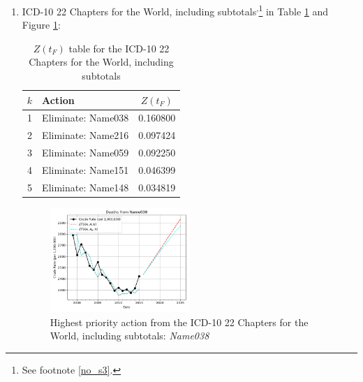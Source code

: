 \documentclass[12pt, a4paper, twocolumn]{article}
\begin{document}
\begin{enumerate}
  \vfill\eject
  \item ICD-10 22 Chapters for the World, including subtotals\cite{whomortality}\textsuperscript{,}\footnote{See footnote \ref{no_s3}.} in Table \ref{table:ztable9} and Figure \ref{fig:k9}:
    \begin{table}[H]
      \centering
      \begin{tabular}{clc}
        \toprule
          $k$ & Action             & $Z(t_F)$ \\
        \midrule
          1   & Eliminate: Name038 & 0.160800 \\
          2   & Eliminate: Name216 & 0.097424 \\
          3   & Eliminate: Name059 & 0.092250 \\
          4   & Eliminate: Name151 & 0.046399 \\
          5   & Eliminate: Name148 & 0.034819 \\
        \bottomrule
      \end{tabular}
      \caption{$Z(t_F)$ table for the ICD-10 22 Chapters for the World, including subtotals}
      \label{table:ztable9}
    \end{table}
    \begin{figure}[H]
      \centering
      \includegraphics[width=0.5\textwidth]{results/WORLD_ICD10_CHAPTERS_ALL/Name038_ets.png}
      \caption{Highest priority action from the ICD-10 22 Chapters for the World, including subtotals: \textit{Name038}}\label{fig:k9}
    \end{figure}
  

\end{enumerate}
\end{document}
